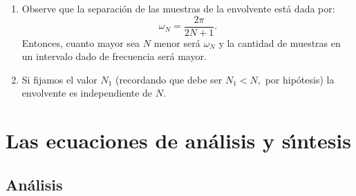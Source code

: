 \begin{enumerate}
	\item Observe que la separaci\'{o}n de las muestras de la envolvente est\'{a} dada por:
	\begin{equation}
		\omega_{N} = \frac{2\pi}{2N + 1}.
	\end{equation}
	Entonces, cuanto mayor sea $N$ menor ser\'{a} $\omega_{N}$ y la cantidad de muestras en un intervalo dado de frecuencia ser\'{a} mayor.
	
	\item Si fijamos el valor $N_{1}$ (recordando que debe ser $N_{1} < N,$ por hip\'{o}tesis) la envolvente es independiente de $N$.
\end{enumerate}

\section{Las ecuaciones de an\'{a}lisis y s\'{\i}ntesis}

\subsection{An\'{a}lisis}

